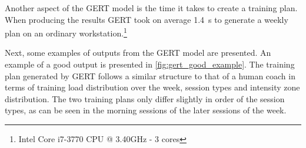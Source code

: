 Another aspect of the GERT model is the time it takes to create a training plan.
When producing the results GERT took on average \SI{1.4}{\second} to generate a weekly plan on an ordinary workstation.\footnote{Intel\textregistered{} Core\texttrademark{} i7-3770 CPU @ 3.40GHz - 3 cores}

Next, some examples of outputs from the GERT model are presented.
An example of a good output is presented in \cref{fig:gert_good_example}.
The training plan generated by GERT follows a similar structure to that of a human coach in terms of training load distribution over the week, session types and intensity zone distribution.
The two training plans only differ slightly in order of the session types, as can be seen in the morning sessions of the later sessions of the week.

